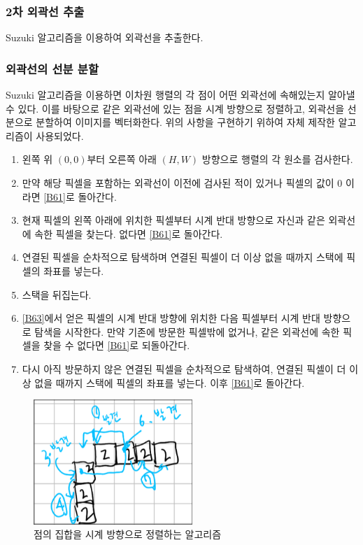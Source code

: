 \documentclass[conference]{IEEEtran}
\begin{document}
\subsubsection{2차 외곽선 추출}
Suzuki 알고리즘을 이용하여 외곽선을 추출한다.\cite{suzuki}

\subsubsection{외곽선의 선분 분할}
Suzuki 알고리즘을 이용하면 이차원 행렬의 각 점이 어떤 외곽선에 속해있는지 알아낼 수 있다.
이를 바탕으로 같은 외곽선에 있는 점을 시계 방향으로 정렬하고, 외곽선을 선분으로 분할하여 이미지를 벡터화한다.
위의 사항을 구현하기 위하여 자체 제작한 알고리즘이 사용되었다.

\begin{enumerate}
    \item 왼쪽 위 $(0, 0)$부터 오른쪽 아래 $(H, W)$ 방향으로 행렬의 각 원소를 검사한다. \label{B61}
    \item 만약 해당 픽셀을 포함하는 외곽선이 이전에 검사된 적이 있거나 픽셀의 값이 0 이라면 \ref{B61}로 돌아간다.
    \item 현재 픽셀의 왼쪽 아래에 위치한 픽셀부터 시계 반대 방향으로 자신과 같은 외곽선에 속한 픽셀을 찾는다. 없다면 \ref{B61}로 돌아간다. \label{B63}
    \item 연결된 픽셀을 순차적으로 탐색하며 연결된 픽셀이 더 이상 없을 때까지 스택에 픽셀의 좌표를 넣는다.
    \item 스택을 뒤집는다.
    \item \ref{B63}에서 얻은 픽셀의 시계 반대 방향에 위치한 다음 픽셀부터 시계 반대 방향으로 탐색을 시작한다.
    만약 기존에 방문한 픽셀밖에 없거나, 같은 외곽선에 속한 픽셀을 찾을 수 없다면 \ref{B61}로 되돌아간다.
    \item 다시 아직 방문하지 않은 연결된 픽셀을 순차적으로 탐색하여, 연결된 픽셀이 더 이상 없을 때까지 스택에 픽셀의 좌표를 넣는다. 이후 \ref{B61}로 돌아간다.
\end{enumerate}

\begin{figure}[H]
    \centering
    \includegraphics[width=6cm]{algo.png}
    \caption{점의 집합을 시계 방향으로 정렬하는 알고리즘}
\end{figure}
\end{document}
